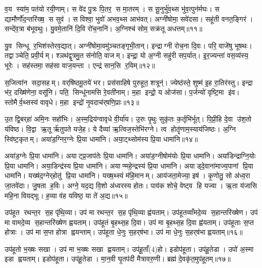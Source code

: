 व॒य स्या॑म॒ पत॑यो रयी॒णाम्। स वे॑द पु॒त्रः पि॒तर॒ स मा॒तरम्। स सू॒नुर्भु॑व॒थ्स भु॑व॒त्पुन॑र्मघः। स द्यामौर्णो॑द॒न्तरि॑ख्ष॒ स सुव॑। स विश्वा॒ भुवो॑ अभव॒थ्स आभ॑वत्। अग्नी॑षोमा॒ सवे॑दसा। सहू॑ती वनत॒ङ्गिर॑। सन्दे॑व॒त्रा ब॑भूवथुः। यु॒वमे॒तानि॑ दि॒वि रो॑च॒नानि॑। अ॒ग्निश्च॑ सोम॒ सक्र॑तू अधत्तम्॥११॥

यु॒व सिन्धू र॒भिश॑स्तेरव॒द्यात्। अग्नी॑षोमा॒वमु॑ञ्चतङ्गृभी॒तान्। इन्द्राग्नी रोच॒ना दि॒वः। परि॒ वाजे॑षु भूषथः। तद्वाञ्चेति॒ प्रवी॒र्यम्। श्ञथ॑द्वृ॒त्रमु॒त स॑नोति॒ वाजम्। इन्द्रा॒ यो अ॒ग्नी सहु॑री सप॒र्यात्। इ॒र॒ज्यन्ता॑ वस॒व्य॑स्य॒ भूरेः। सह॑स्तमा॒ सह॑सा वाज॒यन्ता। एन्द्र॑ सान॒सि र॒यिम्॥१२॥

स॒जित्वा॑न सदा॒सहम्। वर्‌षि॑ष्ठमू॒तये॑ भर। प्रस॑साहिषे पुरुहूत॒ शत्रून्॑। ज्येष्ठ॑स्ते॒ शुष्म॑ इ॒ह रा॒तिर॑स्तु। इन्द्रा भ॑र॒ दख्षि॑णेना॒ वसू॑नि। पति॒ सिन्धू॑नामसि रे॒वती॑नाम्। म॒हा इन्द्रो॒ य ओज॑सा। प॒र्जन्यो॑ वृष्टि॒मा इ॑व। स्तोमैर्व॒थ्सस्य॑ वावृधे। म॒हा इन्द्रो॑ नृ॒वदाच॑र्‌षणि॒प्राः॥१३॥

उ॒त द्वि॒बर्‌हा॑ अमि॒नः सहो॑भिः। अ॒स्म॒द्रिय॑ग्वावृधे वी॒र्या॑य। उ॒रुः पृ॒थुः सुकृ॑तः क॒र्तृभि॑र्भूत्। पि॒प्री॒हि दे॒वा उ॑श॒तो य॑विष्ठ। वि॒द्वा ऋ॒तूर्\mbox{}ऋ॑तुपते यजे॒ह। ये दैव्या॑ ऋ॒त्विज॒स्तेभि॑रग्ने। त्व होतॄ॑णाम॒स्याय॑जिष्ठः। अ॒ग्नि स्वि॑ष्ट॒कृतम्। अया॑ड॒ग्निर॒ग्नेः प्रि॒या धामा॑नि। अया॒ट्थ्सोम॑स्य प्रि॒या धामा॑नि॥१४॥

अया॑ड॒ग्नेः प्रि॒या धामा॑नि। अयाट्प्र॒जाप॑तेः प्रि॒या धामा॑नि। अया॑ड॒ग्नीषोम॑योः प्रि॒या धामा॑नि। अया॑डिन्द्राग्नि॒योः प्रि॒या धामा॑नि। अया॒डिन्द्र॑स्य प्रि॒या धामा॑नि। अयाण्महे॒न्द्रस्य॑ प्रि॒या धामा॑नि। अयाड्दे॒वाना॑माज्य॒पानां प्रि॒या धामा॑नि। यख्ष॑द॒ग्नेर्‌होतु॑ प्रि॒या धामा॑नि। यख्ष॒थ्स्वं म॑हि॒मानम्। आय॑जता॒मेज्या॒ इष॑। कृ॒णोतु॒ सो अ॑ध्व॒रा जा॒तवे॑दाः। जु॒षता ह॒विः। अग्ने॒ यद॒द्य वि॒शो अ॑ध्वरस्य होतः। पाव॑क शोचे॒ वेष्ट्व हि यज्वा। ऋ॒ता य॑जासि महि॒ना वियद्भूः। ह॒व्या व॑ह यविष्ठ॒ या ते॑ अ॒द्य॥१५॥\anuvakamend[अ॒स्त्व॒ध॒त्त॒ र॒यिञ्च॑र्‌षणि॒प्राः सोम॑स्य प्रि॒या धामा॒नीष॒ष्षट्च॑]

उप॑हूत रथन्त॒र स॒ह पृ॑थि॒व्या। उप॑ मा रथन्त॒र स॒ह पृ॑थि॒व्या ह्व॑यताम्। उप॑हूतव्वाँमदे॒व्य स॒हान्तरि॑ख्षेण। उप॑ मा वामदे॒व्य स॒हान्तरि॑ख्षेण ह्वयताम्। उप॑हूतं बृ॒हथ्स॒ह दि॒वा। उप॑ मा बृ॒हथ्स॒ह दि॒वा ह्व॑यताम्। उप॑हूताः स॒प्त होत्राः। उप॑ मा स॒प्त होत्रा ह्वयन्ताम्। उप॑हूता धे॒नुः स॒हर्‌ष॑भा। उप॑ मा धे॒नुः स॒हर्‌ष॑भा ह्वयताम्॥१६॥

उप॑हूतो भ॒ख्षः सखा। उप॑ मा भ॒ख्षः सखा ह्वयताम्। उप॑हू॒ताँ(4)हो। इडोप॑हूता। उप॑हू॒तेडा। उपो॑ अ॒स्मा इडा ह्वयताम्। इडोप॑हूता। उप॑हू॒तेडा। मा॒न॒वी घृ॒तप॑दी मैत्रावरु॒णी। ब्रह्म॑ दे॒वकृ॑त॒मुप॑हूतम्॥१७॥

